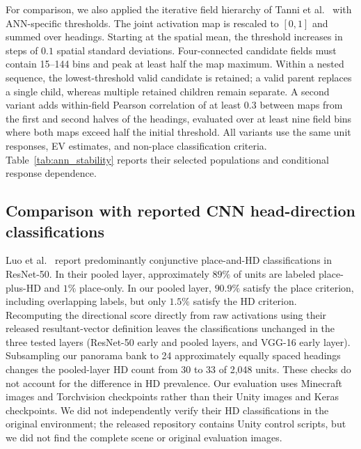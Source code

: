 \documentclass[11pt]{article}
\begin{document}
For comparison, we also applied the iterative field hierarchy of Tanni et al.~\cite{Tanni2022} with ANN-specific thresholds. The joint activation map is rescaled to $[0,1]$ and summed over headings. Starting at the spatial mean, the threshold increases in steps of $0.1$ spatial standard deviations. Four-connected candidate fields must contain 15--144 bins and peak at least half the map maximum. Within a nested sequence, the lowest-threshold valid candidate is retained; a valid parent replaces a single child, whereas multiple retained children remain separate. A second variant adds within-field Pearson correlation of at least $0.3$ between maps from the first and second halves of the headings, evaluated over at least nine field bins where both maps exceed half the initial threshold. All variants use the same unit responses, EV estimates, and non-place classification criteria. Table~\ref{tab:ann_stability} reports their selected populations and conditional response dependence.


\FloatBarrier

\subsection*{Comparison with reported CNN head-direction classifications}
Luo et al.~\cite{Luo2024} report predominantly conjunctive place-and-HD classifications in ResNet-50. In their pooled layer, approximately $89\%$ of units are labeled place-plus-HD and $1\%$ place-only. In our pooled layer, $90.9\%$ satisfy the place criterion, including overlapping labels, but only $1.5\%$ satisfy the HD criterion. Recomputing the directional score directly from raw activations using their released resultant-vector definition leaves the classifications unchanged in the three tested layers (ResNet-50 early and pooled layers, and VGG-16 early layer). Subsampling our panorama bank to 24 approximately equally spaced headings changes the pooled-layer HD count from 30 to 33 of 2,048 units. These checks do not account for the difference in HD prevalence. Our evaluation uses Minecraft images and Torchvision checkpoints rather than their Unity images and Keras checkpoints. We did not independently verify their HD classifications in the original environment; the released repository contains Unity control scripts, but we did not find the complete scene or original evaluation images.
\end{document}
